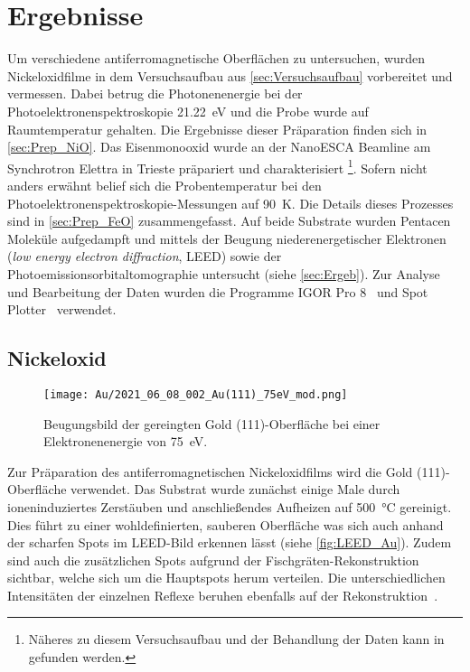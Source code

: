 \chapter{Ergebnisse}
    Um verschiedene antiferromagnetische Oberflächen zu untersuchen, wurden Nickeloxidfilme in dem Versuchsaufbau aus \autoref{sec:Versuchsaufbau} vorbereitet und vermessen.
    Dabei betrug die Photonenenergie bei der Photoelektronenspektroskopie \SI{21.22}{\electronvolt} und die Probe wurde auf Raumtemperatur gehalten.
    Die Ergebnisse dieser Präparation finden sich in \autoref{sec:Prep_NiO}.
    Das Eisenmonooxid wurde an der NanoESCA Beamline am Synchrotron Elettra in Trieste präpariert und charakterisiert \footnote{Näheres zu diesem Versuchsaufbau und der Behandlung der Daten kann in~\cite{ma-DJ} gefunden werden.}.
    Sofern nicht anders erwähnt belief sich die Probentemperatur bei den Photoelektronenspektroskopie-Messungen auf \SI{90}{\kelvin}.
    Die Details dieses Prozesses sind in \autoref{sec:Prep_FeO} zusammengefasst.
    Auf beide Substrate wurden Pentacen Moleküle aufgedampft und mittels der Beugung niederenergetischer Elektronen (\textit{low energy electron diffraction}, LEED) sowie der Photoemissionsorbitaltomographie untersucht (siehe \autoref{sec:Ergeb}).
    Zur Analyse und Bearbeitung der Daten wurden die Programme IGOR Pro 8~\cite{IGOR} und Spot Plotter~\cite{SpotPlotter} verwendet. %

    \section{Nickeloxid} \label{sec:Prep_NiO}
        \begin{figure}
            \centering
            \texttt{[image: Au/2021\_06\_08\_002\_Au(111)\_75eV\_mod.png]}            
            \caption{Beugungsbild der gereingten Gold (111)-Oberfläche bei einer Elektronenenergie von \SI{75}{\electronvolt}.}
            \label{fig:LEED_Au}
        \end{figure}
        Zur Präparation des antiferromagnetischen Nickeloxidfilms wird die Gold (111)-Oberfläche verwendet.
        Das Substrat wurde zunächst einige Male durch ioneninduziertes Zerstäuben und anschließendes Aufheizen auf \SI{500}{\celsius} gereinigt.
        Dies führt zu einer wohldefinierten, sauberen Oberfläche was sich auch anhand der scharfen Spots im LEED-Bild erkennen lässt (siehe \autoref{fig:LEED_Au}).
        Zudem sind auch die zusätzlichen Spots aufgrund der Fischgräten-Rekonstruktion sichtbar, welche sich um die Hauptspots herum verteilen.
        Die unterschiedlichen Intensitäten der einzelnen Reflexe beruhen ebenfalls auf der Rekonstruktion~\cite{haag_epitaxial_2016}.

